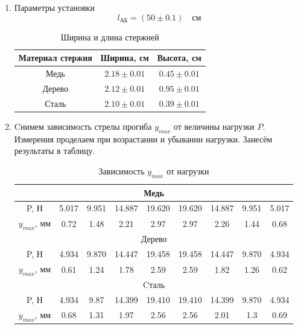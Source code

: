 \documentclass[a4paper,12 pt]{article}
\begin{document}
\begin{enumerate}
    \item Параметры установки
    \begin{displaymath}
        l_{\text{АБ}} = (50 \pm 0.1) \quad \text{см}
    \end{displaymath}
    \begin{table}[H]
        \centering
        \begin{tabular}{|c|c|c|}
            \hline
            Материал стержня & Ширина, см & Высота, см \\
            \hline
            Медь & $2.18 \pm 0.01$ & $0.45 \pm 0.01$ \\
            \hline
            Дерево & $2.12 \pm 0.01$ & $0.95 \pm 0.01$ \\
            \hline
            Сталь & $2.10 \pm 0.01$ & $0.39 \pm 0.01$ \\
            \hline
        \end{tabular}
        \caption{Ширина и длина стержней}
    \end{table}
    \item Cнимем зависимость стрелы прогиба $y_{max}$ от величины нагрузки $P$. Измерения проделаем при возрастании и убывании нагрузки. Занесём результаты в таблицу.
    \begin{table}[H]
        \centering
        \begin{tabular}{|c|c|c|c|c||c|c|c|c|}
            \hline
            \multicolumn{9}{|c|}{Медь} \\
            \hline
            P, Н & 5.017 & 9.951 & 14.887 & 19.620 & 19.620 & 14.887 & 9.951 & 5.017 \\
            \hline
            $y_{max}$, мм & 0.72 & 1.48 & 2.21 & 2.97 & 2.97 & 2.26  & 1.44 & 0.68 \\
            \hline
            \hline
            \multicolumn{9}{|c|}{Дерево} \\
            \hline
            P, Н & 4.934 & 9.870 & 14.447 & 19.458 & 19.458 & 14.447 & 9.870 & 4.934 \\
            \hline
            $y_{max}$, мм & 0.61 & 1.24 & 1.78 & 2.59 & 2.59 & 1.82 & 1.26 & 0.62 \\
            \hline
            \hline
            \multicolumn{9}{|c|}{Cталь} \\
            \hline
            P, Н & 4.934 & 9.87 & 14.399 & 19.410 & 19.410 & 14.399 & 9.870 & 4.934 \\
            \hline
            $y_{max}$, мм & 0.68 & 1.31 & 1.97 & 2.56 & 2.56 & 2.01 & 1.3 & 0.69 \\
            \hline
        \end{tabular}
        \caption{Зависимость $y_{max}$ от нагрузки}
    \end{table}


\end{enumerate}
\end{document}
